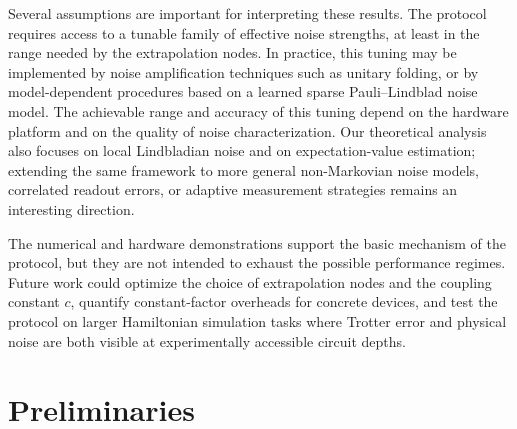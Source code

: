 \documentclass[aps,pra,reprint,groupedaddress,floatfix]{revtex4-2}
\begin{document}
Several assumptions are important for interpreting these results. The protocol requires access to a tunable family of effective noise strengths, at least in the range needed by the extrapolation nodes. In practice, this tuning may be implemented by noise amplification techniques such as unitary folding, or by model-dependent procedures based on a learned sparse Pauli--Lindblad noise model. The achievable range and accuracy of this tuning depend on the hardware platform and on the quality of noise characterization. Our theoretical analysis also focuses on local Lindbladian noise and on expectation-value estimation; extending the same framework to more general non-Markovian noise models, correlated readout errors, or adaptive measurement strategies remains an interesting direction.

The numerical and hardware demonstrations support the basic mechanism of the protocol, but they are not intended to exhaust the possible performance regimes. Future work could optimize the choice of extrapolation nodes and the coupling constant $c$, quantify constant-factor overheads for concrete devices, and test the protocol on larger Hamiltonian simulation tasks where Trotter error and physical noise are both visible at experimentally accessible circuit depths.

\clearpage
\appendix

\section{Preliminaries}
\end{document}
